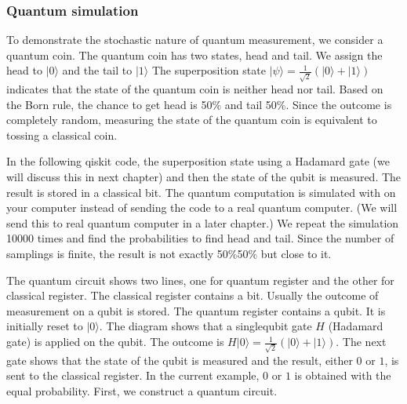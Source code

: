 \documentclass[letterpaper,10pt,english]{jupyterBook}
\begin{document}
\subsubsection{Quantum simulation}
\label{\detokenize{qubit/measurement:quantum-simulation}}
\sphinxAtStartPar
To demonstrate the stochastic nature of quantum measurement, we consider a quantum coin.  The quantum coin has two states, head and tail. We assign the head to \(|0\rangle\) and the tail to \(|1\rangle\)  The superposition state \(|\psi\rangle = \frac{1}{\sqrt{2}}\left(|0\rangle+|1\rangle\right)\) indicates that the state of the quantum coin is neither head nor tail.  Based on the Born rule, the chance to get head is 50\% and tail 50\%.  Since the outcome is completely random, measuring the state of the quantum coin is equivalent to tossing a classical coin.

\sphinxAtStartPar
In the following qiskit code, the superposition state using a Hadamard gate (we will discuss this in next chapter) and then the state of the qubit is measured.  The result is stored in a classical bit. The quantum computation is simulated with  on your computer instead of sending the code to a real quantum computer. (We will send this to real quantum computer in a later chapter.) We repeat the simulation 10000 times and find the probabilities to find head and tail. Since the number of samplings is finite, the result is not exactly 50\%\sphinxhyphen{}50\% but close to  it.

\sphinxAtStartPar
The quantum circuit shows two lines, one for quantum register and the other for classical register.  The classical register contains a bit.  Usually the outcome of measurement on a qubit is stored. The quantum register contains a qubit.  It is initially reset to \(|0\rangle\).  The diagram shows that a single\sphinxhyphen{}qubit gate \(H\) (Hadamard gate) is applied on the qubit.  The outcome is \(H |0\rangle = \frac{1}{\sqrt{2}} \left(|0\rangle + |1\rangle \right)\).  The next gate shows that the state of the qubit is measured and the result, either \(0\) or \(1\), is sent to the classical register.  In the current example, \(0\) or \(1\) is obtained with the equal probability. First, we construct a quantum circuit.
\end{document}
